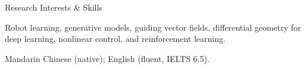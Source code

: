 \begin{rubric}{Research Interests \& Skills}

    Robot learning, generative models, guiding vector fields, differential geometry for deep learning, nonlinear control, and reinforcement learning.

    Mandarin Chinese (native); English (fluent, IELTS 6.5).

\end{rubric}
